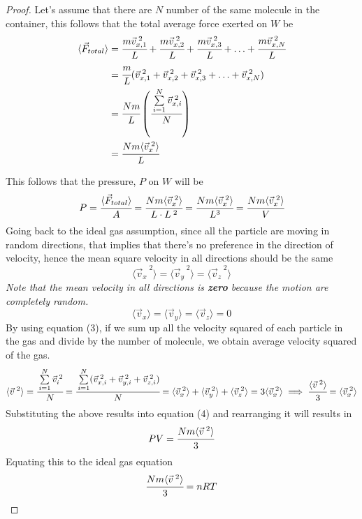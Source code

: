 \documentclass{article}
\begin{document}
\begin{proof}
Let's assume that there are $N$ number of the same molecule in the container, this follows that the total average force exerted on $W$ be
\begin{align*}
\langle \vec{F}_{total} \rangle&=\cfrac{m{\vec{v}_{x,1}}^{\; 2}}{L}+\cfrac{m{\vec{v}_{x,2}}^{\; 2}}{L}+\cfrac{m{\vec{v}_{x,3}}^{\; 2}}{L}+\hdots+\cfrac{m{\vec{v}_{x,N}}^{\; 2}}{L}\\ &=\cfrac{m}{L}({\vec{v}_{x,1}}^{\; 2}+{\vec{v}_{x,2}}^{\; 2}+{\vec{v}_{x,3}}^{\; 2}+\hdots +{\vec{v}_{x,N}}^{\; 2})\\ &=\cfrac{Nm}{L}\left(\cfrac{\sum\limits_{i=1}^N {\vec{v}_{x,i}}^{\;2}}{N}\right)\\ &= \cfrac{Nm \langle {\vec{v}_x}^{\; 2} \rangle}{L}
\end{align*}

This follows that the pressure, $P$ on $W$ will be
\begin{equation}
P=\cfrac{\langle \vec{F}_{total} \rangle}{A}=\cfrac{Nm \langle {\vec{v}_x}^{\;2} \rangle}{L \cdot L^{\; 2}}=\cfrac{Nm \langle {\vec{v}_x}^{\;2} \rangle}{L^3}=\cfrac{Nm
\langle {\vec{v}_x}^{\;2} \rangle}{V}
\end{equation}
Going back to the ideal gas assumption, since all the particle are moving in random directions, that implies that there's no preference in the direction of velocity, hence the mean square velocity in all directions should be the same
$$\langle {\vec{v}_x}^{\;2} \rangle=\langle {\vec{v}_y}^{\;2} \rangle=\langle {\vec{v}_z}^{\;2} \rangle$$
\textit{Note that the mean velocity in all directions is \textbf{zero} because the motion are completely random.}
$$\langle \vec{v}_x \rangle =\langle \vec{v}_y \rangle=\langle \vec{v}_z \rangle=0$$
By using equation (3), if we sum up all the velocity squared of each particle in the gas and divide by the number of molecule, we obtain average velocity squared of the gas.
$$\langle \vec{v}^{\;2} \rangle=\cfrac{\sum\limits_{i=1}^N {\vec{v}_i}^{\;2}}{N}=\cfrac{\sum\limits_{i=1}^N({\vec{v}_{x,i}^{\;2}}+{\vec{v}_{y,i}^{\;2}}+{{\vec{v}_{z,i}}^{\;2}})}{N}=\langle \vec{v}_x^{\;2} \rangle+\langle \vec{v}_y^{\;2} \rangle+\langle \vec{v}_z^{\;2} \rangle=3\langle \vec{v}_x^{\;2} \rangle \implies \cfrac{\langle {\vec{v}^{\;2}}\rangle}{3}=\langle \vec{v}_x^{\;2} \rangle$$
Substituting the above results into equation (4) and rearranging it will results in 
$$PV=\cfrac{Nm\langle {\vec{v}}^{\;2} \rangle}{3}$$
Equating this to the ideal gas equation
\begin{align}
    \cfrac{Nm\langle {\vec{v}}^{\;2} \rangle}{3}&=nRT  \nonumber \\ 

\end{align}
\end{proof}
\end{document}
